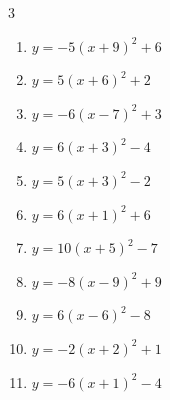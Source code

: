 \begin{multicols}{3}
\begin{enumerate}
  \item $\displaystyle y=-5\left( x+9\right)^{2}+6$

        \phantom{$\displaystyle 頂点\left( -9 , 6 \right)$}

  \item $\displaystyle y=5\left( x+6\right)^{2}+2$

        \phantom{$\displaystyle 頂点\left( -6 , 2 \right)$}

  \item $\displaystyle y=-6\left( x-7\right)^{2}+3$

        \phantom{$\displaystyle 頂点\left( 7 , 3 \right)$}

  \item $\displaystyle y=6\left( x+3\right)^{2}-4$

        \phantom{$\displaystyle 頂点\left( -3 , -4 \right)$}

  \item $\displaystyle y=5\left( x+3\right)^{2}-2$

        \phantom{$\displaystyle 頂点\left( -3 , -2 \right)$}

  \item $\displaystyle y=6\left( x+1\right)^{2}+6$

        \phantom{$\displaystyle 頂点\left( -1 , 6 \right)$}

  \item $\displaystyle y=10\left( x+5\right)^{2}-7$

        \phantom{$\displaystyle 頂点\left( -5 , -7 \right)$}

  \item $\displaystyle y=-8\left( x-9\right)^{2}+9$

        \phantom{$\displaystyle 頂点\left( 9 , 9 \right)$}

  \item $\displaystyle y=6\left( x-6\right)^{2}-8$

        \phantom{$\displaystyle 頂点\left( 6 , -8 \right)$}

\columnbreak %

  \item $\displaystyle y=-2\left( x+2\right)^{2}+1$

        \phantom{$\displaystyle 頂点\left( -2 , 1 \right)$}

  \item $\displaystyle y=-6\left( x+1\right)^{2}-4$

        \phantom{$\displaystyle 頂点\left( -1 , -4 \right)$}


\end{enumerate}
\end{multicols}
